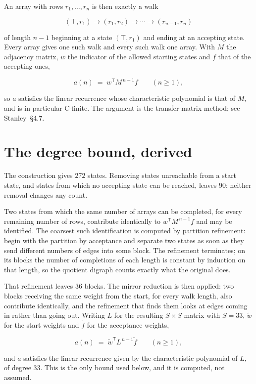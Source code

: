 \documentclass[11pt]{article}
\theoremstyle{definition}
\begin{document}
An array with rows $r_1,\dots,r_n$ is then exactly a walk

\[(\top,r_1) \to (r_1,r_2) \to \cdots \to (r_{n-1},r_n)\]

of length $n-1$ beginning at a state $(\top,r_1)$ and ending at an accepting state. Every array gives one such walk and every such walk one array. With $M$ the adjacency matrix, $w$ the indicator of the allowed starting states and $f$ that of the accepting ones,

\[a(n) \;=\; w^{\mathsf T} M^{\,n-1} f \qquad (n \ge 1),\]

so $a$ satisfies the linear recurrence whose characteristic polynomial is that of $M$, and is in particular C-finite. The argument is the transfer-matrix method; see Stanley~\S4.7.

\section{The degree bound, derived}

The construction gives $272$ states. Removing states unreachable from a start state, and states from which no accepting state can be reached, leaves $90$; neither removal changes any count.

Two states from which the same number of arrays can be completed, for every remaining number of rows, contribute identically to $w^{\mathsf T}M^{\,n-1}f$ and may be identified. The coarsest such identification is computed by partition refinement: begin with the partition by acceptance and separate two states as soon as they send different numbers of edges into some block. The refinement terminates; on its blocks the number of completions of each length is constant by induction on that length, so the quotient digraph counts exactly what the original does.

That refinement leaves $36$ blocks. The mirror reduction is then applied: two blocks receiving the same weight from the start, for every walk length, also contribute identically, and the refinement that finds them looks at edges coming in rather than going out. Writing $L$ for the resulting $S \times S$ matrix with $S = 33$, $\tilde w$ for the start weights and $\tilde f$ for the acceptance weights,

\[a(n) \;=\; \tilde w^{\mathsf T} L^{\,n-1} \tilde f \qquad (n \ge 1),\]

and $a$ satisfies the linear recurrence given by the characteristic polynomial of $L$, of degree $33$. This is the only bound used below, and it is computed, not assumed.
\end{document}

